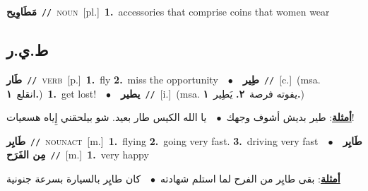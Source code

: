 \documentclass[10pt,a4paper,twoside]{article} %
\begin{document}
\begin{multicols}{2}
{\setlength\topsep{0pt}\textbf{\foreignlanguage{arabic}{مَطَاوِيح}}\ {\color{gray}\texttt{//}\color{black}}\ \textsc{noun}\ [pl.]\ \textbf{1.}~accessories that comprise coins that women wear\ } \vspace{2mm}

\vspace{-3mm}
\subsection*{\color{blue}\foreignlanguage{arabic}{ط.ي.ر}\color{blue}{}} 

{\setlength\topsep{0pt}\textbf{\foreignlanguage{arabic}{طَار}}\ {\color{gray}\texttt{//}\color{black}}\ \textsc{verb}\ [p.]\ \textbf{1.}~fly  \textbf{2.}~miss the opportunity\ \ $\bullet$\ \ \setlength\topsep{0pt}\textbf{\foreignlanguage{arabic}{طِير}}\ {\color{gray}\texttt{//}\color{black}}\ [c.]\ \color{gray}(msa. \foreignlanguage{arabic}{انقلع}~\foreignlanguage{arabic}{\textbf{١.}})\color{black}\ \textbf{1.}~get lost!\ \ $\bullet$\ \ \setlength\topsep{0pt}\textbf{\foreignlanguage{arabic}{يطير}}\ {\color{gray}\texttt{//}\color{black}}\ [i.]\ \color{gray}(msa. \foreignlanguage{arabic}{يفوته فرصة}~\foreignlanguage{arabic}{\textbf{٢.}}  \foreignlanguage{arabic}{يَطِير}~\foreignlanguage{arabic}{\textbf{١.}})\color{black}\  \begin{flushright}\color{gray}\foreignlanguage{arabic}{\textbf{\underline{\foreignlanguage{arabic}{أمثلة}}}: طير بديش أشوف وجهك\ $\bullet$\ \  يا الله الكيس طار بعيد. شو بيلحقني إِياه هسعيات!}\end{flushright}\color{black}} \vspace{2mm}

{\setlength\topsep{0pt}\textbf{\foreignlanguage{arabic}{طَايِر}}\ {\color{gray}\texttt{//}\color{black}}\ \textsc{noun\textunderscore act}\ [m.]\ \textbf{1.}~flying  \textbf{2.}~going very fast.  \textbf{3.}~driving very fast\ \ $\bullet$\ \ \setlength\topsep{0pt}\textbf{\foreignlanguage{arabic}{طَايِر مِن الفَرَح}}\ {\color{gray}\texttt{//}\color{black}}\ [m.]\ \textbf{1.}~very happy\  \begin{flushright}\color{gray}\foreignlanguage{arabic}{\textbf{\underline{\foreignlanguage{arabic}{أمثلة}}}: بقى طايِر من الفرح لما استلم شهادته\ $\bullet$\ \  كان طايِِر بالسيارة بسرعة جنونية}\end{flushright}\color{black}} \vspace{2mm}


\end{multicols}
\end{document}
